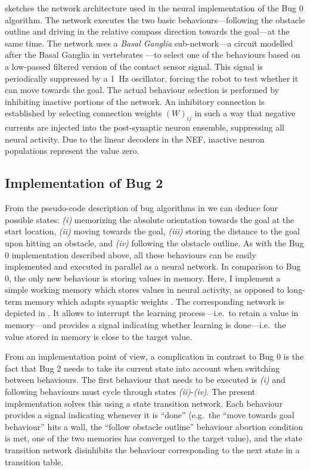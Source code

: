 \documentclass[letterpaper,10pt,conference]{ieeeconf}
\begin{document}
 sketches the network architecture used in the neural implementation of the Bug 0 algorithm. The network executes the two basic behaviours---following the obstacle outline and driving in the relative compass direction towards the goal---at the same time. The network uses a \emph{Basal Ganglia} sub-network---a circuit modelled after the Basal Ganglia in vertebrates \cite{stewart2010a}---to select one of the behaviours based on a low-passed filtered version of the contact sensor signal. This signal is periodically suppressed by a \SI{1}{\hertz} oscillator, forcing the robot to test whether it can move towards the goal. The actual behaviour selection is performed by inhibiting inactive portions of the network. An inhibitory connection is established by selecting connection weights $(W)_{ij}$ in such a way that negative currents are injected into the post-synaptic neuron ensemble, suppressing all neural activity. Due to the linear decoders in the NEF, inactive neuron populations represent the value zero.

\subsection{Implementation of Bug 2}

From the pseudo-code description of bug algorithms in  we can deduce four possible states: \emph{(i)} memorizing the absolute orientation towards the goal at the start location, \emph{(ii)} moving towards the goal, \emph{(iii)} storing the distance to the goal upon hitting an obstacle, and \emph{(iv)} following the obstacle outline. As with the Bug 0 implementation described above, all these behaviours can be easily implemented and executed in parallel as a neural network. In comparison to Bug 0, the only new behaviour is storing values in memory. Here, I implement a simple working memory which stores values in neural activity, as opposed to long-term memory which adapts synaptic weights \cite{eliasmith2013build}. The corresponding network is depicted in . It allows to interrupt the learning process---i.e.~to retain a value in memory---and provides a signal indicating whether learning is done---i.e.~the value stored in memory is close to the target value.

From an implementation point of view, a complication in contrast to Bug 0 is the fact that Bug 2 needs to take its current state into account when switching between behaviours. The first behaviour that needs to be executed is \emph{(i)} and following behaviours must cycle through states \emph{(ii)}-\emph{(iv)}. The present implementation solves this using a state transition network. Each behaviour provides a signal indicating whenever it is \enquote{done} (e.g.~the \enquote{move towards goal behaviour} hits a wall, the \enquote{follow obstacle outline} behaviour abortion condition is met, one of the two memories has converged to the target value), and the state transition network disinhibits the behaviour corresponding to the next state in a transition table.
\end{document}
